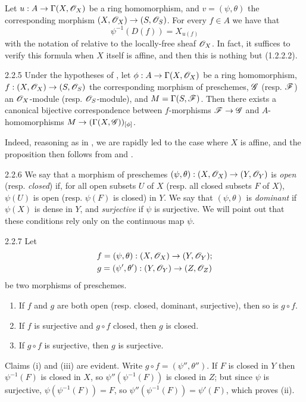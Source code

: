 Let $u:A\to\Gamma(X,\mathscr{O}_X)$ be a ring homomorphism, and $v=(\psi,\theta)$
the corresponding morphism $(X,\mathscr{O}_X)\to(S,\mathscr{O}_S)$. For every $f\in A$ we have
that
\[
  \psi^{-1}(D(f))=X_{u(f)}
  \tag{2.2.4.1}
\]
with the notation of  relative to the locally-free sheaf
$\mathscr{O}_X$. In fact, it suffices to verify this formula when $X$ itself is affine,
and then this is nothing but (1.2.2.2).

\begin{envs}[Proposition]{2.2.5}
\label{prop-1.2.2.5}
Under the hypotheses of , let
$\phi:A\to\Gamma(X,\mathscr{O}_X)$ be a ring homomorphism,
$f:(X,\mathscr{O}_X)\to(S,\mathscr{O}_S)$ the corresponding morphism of preschemes,
$\mathscr{G}$ (resp. $\mathscr{F}$) an $\mathscr{O}_X$-module (resp. $\mathscr{O}_S$-module), and
$M=\Gamma(S,\mathscr{F})$. Then there exists a canonical bijective
correspondence between $f$-morphisms $\mathscr{F}\to\mathscr{G}$  and
$A$-homomorphisms $M\to(\Gamma(X,\mathscr{G}))_{[\phi]}$.
\end{envs}

Indeed, reasoning as in , we are rapidly led to the case where $X$ is
affine, and the proposition then follows from  and .

\begin{env}{2.2.6}
\label{env-1.2.2.6}
We say that a morphism of preschemes
$(\psi,\theta):(X,\mathscr{O}_X)\to(Y,\mathscr{O}_Y)$ is \emph{open} (resp. \emph{closed})
if, for all open subsets $U$ of $X$ (resp. all closed subsets $F$ of $X$),
$\psi(U)$ is open (resp. $\psi(F)$ is closed) in $Y$. We say that
$(\psi,\theta)$ is \emph{dominant} if $\psi(X)$ is dense in $Y$, and
\emph{surjective} if $\psi$ is surjective. We will point out that these
conditions rely only on the continuous map $\psi$.
\end{env}

\begin{envs}[Proposition]{2.2.7}
\label{prop-1.2.2.7}
Let
\begin{gather*}
  f=(\psi,\theta):(X,\mathscr{O}_X)\to(Y,\mathscr{O}_Y);\\
  g=(\psi',\theta'):(Y,\mathscr{O}_Y)\to(Z,\mathscr{O}_Z)
\end{gather*}
be two morphisms of
preschemes.
\begin{enumerate}[label=\rm{(\roman*)}]
  \item If $f$ and $g$ are both open (resp. closed, dominant, surjective),
        then so is $g\circ f$.
  \item If $f$ is surjective and $g\circ f$ closed, then $g$ is closed.
  \item If $g\circ f$ is surjective, then $g$ is surjective.
\end{enumerate}
\end{envs}
Claims (i) and (iii) are evident. Write $g\circ f=(\psi'',\theta'')$.
If $F$ is closed in $Y$ then $\psi^{-1}(F)$ is closed in $X$, so
$\psi''(\psi^{-1}(F))$ is closed in $Z$; but since $\psi$ is surjective,
$\psi(\psi^{-1}(F))=F$, so $\psi''(\psi^{-1}(F))=\psi'(F)$, which proves (ii).

